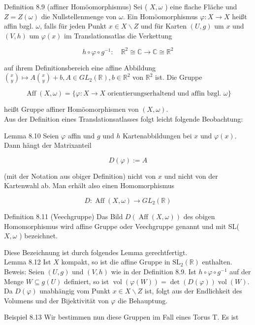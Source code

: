 \documentclass[10pt, letterpaper]{article}
\begin{document}
Definition 8.9 (affiner Homöomorphismus) Sei ( $X, \omega$ ) eine flache Fläche und $Z=Z(\omega)$ die Nullstellenmenge von $\omega$. Ein Homöomorphismus $\varphi: X \longrightarrow X$ heißt affin bzgl. $\omega$, falls für jeden Punkt $x \in X \backslash Z$ und für Karten $(U, g)$ um $x$ und $(V, h)$ um $\varphi(x)$ im Translationsatlas die Verkettung

$$
h \circ \varphi \circ g^{-1}: \quad \mathbb{R}^{2} \cong \mathbb{C} \longrightarrow \mathbb{C} \cong \mathbb{R}^{2}
$$

auf ihrem Definitionsbereich eine affine Abbildung $\binom{x}{y} \longmapsto A\binom{x}{y}+b, A \in G L_{2}(\mathbb{R}), b \in \mathbb{R}^{2}$ von $\mathbb{R}^{2}$ ist. Die Gruppe

$$
\operatorname{Aff}(X, \omega)=\{\varphi: X \longrightarrow X \text { orientierungserhaltend und affin bzgl. } \omega\}
$$

heißt Gruppe affiner Homöomorphismen von $(X, \omega)$.\\
Aus der Definition eines Translationsatlasses folgt leicht folgende Beobachtung:

Lemma 8.10 Seien $\varphi$ affin und $g$ und $h$ Kartenabbildungen bei $x$ und $\varphi(x)$. Dann hängt der Matrixanteil

$$
D(\varphi):=A
$$

(mit der Notation aus obiger Definition) nicht von $x$ und nicht von der Kartenwahl ab. Man erhält also einen Homomorphismus

$$
D: \operatorname{Aff}(X, \omega) \longrightarrow G L_{2}(\mathbb{R})
$$

Definition 8.11 (Veechgruppe) Das Bild $D(\operatorname{Aff}(X, \omega))$ des obigen Homomorphismus wird affine Gruppe oder Veechgruppe genannt und mit SL( $X, \omega$ ) bezeichnet.

Diese Bezeichnung ist durch folgendes Lemma gerechtfertigt.\\
Lemma 8.12 Ist $X$ kompakt, so ist die affine Gruppe in $\mathrm{SL}_{2}(\mathbb{R})$ enthalten.\\
Beweis: Seien $(U, g)$ und $(V, h)$ wie in der Definition 8.9. Ist $h \circ \varphi \circ g^{-1}$ auf der Menge $W \subseteq g(U)$ definiert, so ist $\operatorname{vol}(\varphi(W))=\operatorname{det}(D(\varphi)) \operatorname{vol}(W)$. Da $D(\varphi)$ unabhängig vom Punkt $x \in X \backslash Z$ ist, folgt aus der Endlichkeit des Volumens und der Bijektivität von $\varphi$ die Behauptung.

Beispiel 8.13 Wir bestimmen nun diese Gruppen im Fall eines Torus T. Es ist
\end{document}
